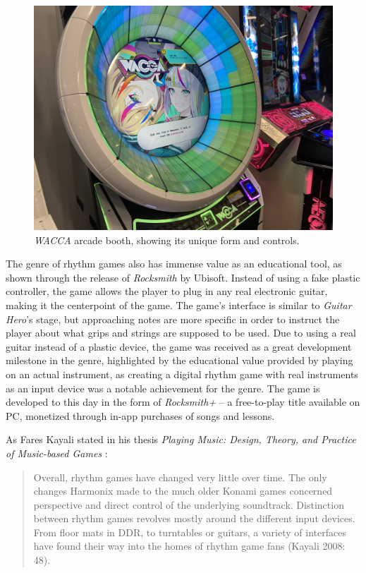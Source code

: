 \begin{figure}[h]
    \centering\includegraphics[scale=0.01]{obrazki/waccaarcade.jpg}
    \caption{\textit{WACCA} arcade booth, showing its unique form and controls. \cite{waccaarcade}}
    \label{fig:wacca_arcade}
\end{figure}

The genre of rhythm games also has immense value as an educational tool, as shown through the release of \textit{Rocksmith} by Ubisoft. Instead of using a fake plastic controller, the game allows the player to plug in any real electronic guitar, making it the centerpoint of the game. The game’s interface is similar to \textit{Guitar Hero}’s stage, but approaching notes are more specific in order to instruct the player about what grips and strings are supposed to be used. Due to using a real guitar instead of a plastic device, the game was received as a great development milestone in the genre, highlighted by the educational value provided by playing on an actual instrument, as creating a digital rhythm game with real instruments as an input device was a notable achievement for the genre. The game is developed to this day in the form of \textit{Rocksmith+} -- a free-to-play title available on PC, monetized through in-app purchases of songs and lessons.

As Fares Kayali stated in his thesis \textit{Playing Music: Design, Theory, and Practice of Music-based Games} \cite{faresplayingmusic}: 
\begin{quote}
    Overall, rhythm games have changed very little over time. The only changes Harmonix made to the much older Konami games concerned perspective and direct control of the underlying soundtrack. Distinction between rhythm games revolves mostly around the different input devices. From floor mats in DDR, to turntables or guitars, a variety of interfaces have found their way into the homes of rhythm game fans (Kayali 2008: 48).
\end{quote}


